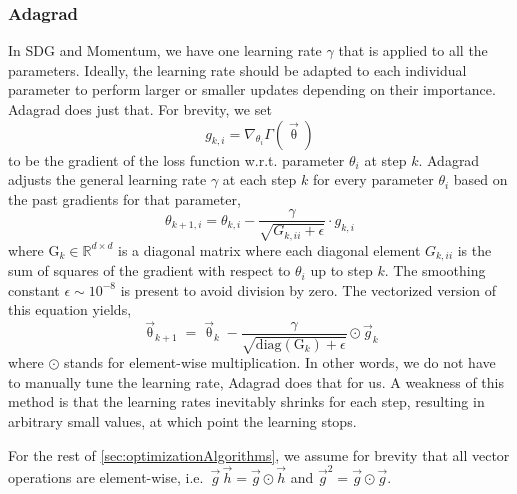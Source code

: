 \documentclass[twoside,english]{uiofysmaster}
\begin{document}
\subsubsection{Adagrad}
In SDG and Momentum, we have one learning rate $\gamma$ that is applied to all the parameters. 
Ideally, the learning rate should be adapted to each individual parameter to perform larger or smaller updates
depending on their importance. Adagrad \cite{Duchi11} does just that. For brevity, we set
\begin{equation}
 g_{k,i} = \nabla_{\theta_i} \Gamma (\vec{\uptheta})
\end{equation}
to be the gradient of the loss function w.r.t. parameter $\theta_i$ at step $k$. Adagrad adjusts the general learning rate $\gamma$
at each step $k$ for every parameter $\theta_i$ based on the past gradients for that parameter,
\begin{equation}
 \theta_{k+1,i} = \theta_{k,i} - \frac{\gamma}{\sqrt{G_{k,ii} + \epsilon}} \cdot g_{k,i}
\end{equation}
where $\mathrm{G}_k \in \mathbb{R}^{d \times d}$ is a diagonal matrix where each diagonal element $G_{k,ii}$ is the sum of squares
of the gradient with respect to $\theta_i$ up to step $k$. The smoothing constant $\epsilon \sim 10^{-8}$ is present to avoid
division by zero. The vectorized version of this equation yields,
\begin{equation}
  \vec{\uptheta}_{k+1} = \vec{\uptheta}_k - \frac{\gamma}{\sqrt{\mathrm{diag}(\mathrm{G}_k) + \epsilon}} \odot \vec{g}_k
  \label{Adagrad}
\end{equation}
where $\odot$ stands for element-wise multiplication. In other words, we do not have to manually tune the learning rate, 
Adagrad does that for us. A weakness of this method is that the learning rates inevitably shrinks for each step, 
resulting in arbitrary small values, at which point the learning stops.

For the rest of \autoref{sec:optimizationAlgorithms}, we assume for brevity that all vector operations are element-wise, i.e.\
$\vec{g}\,\vec{h} = \vec{g} \odot \vec{h}$ and $\vec{g}^2 = \vec{g} \odot \vec{g}$.
\end{document}
